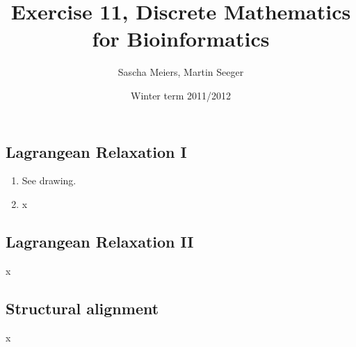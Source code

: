 \documentclass[a4paper, oneside]{scrartcl}
\author{Sascha Meiers, Martin Seeger}
\title{Exercise 11, Discrete Mathematics for Bioinformatics}
\date{Winter term 2011/2012}
\begin{document}
\maketitle


\subsection{Lagrangean Relaxation I}

\renewcommand{\labelenumi}{\alph{enumi})}
\begin{enumerate}
  \item See drawing.
  \item x
\end{enumerate}

\subsection{Lagrangean Relaxation II}

x

\subsection{Structural alignment}

x
\end{document}
